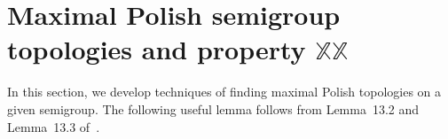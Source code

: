 \documentclass[11pt]{amsart}
\newtheorem{proposition}[theorem]{Proposition}
\theoremstyle{definition}
\newcommand{\N}{\mathbb N}
\begin{document}


   














\section{Maximal Polish semigroup topologies and property $\mathbb{XX}$}

In this section, we develop techniques of finding maximal Polish topologies on a given semigroup.
The following useful lemma follows from Lemma~13.2 and Lemma~13.3 of~\cite{Kechris1995}.
\end{document}
